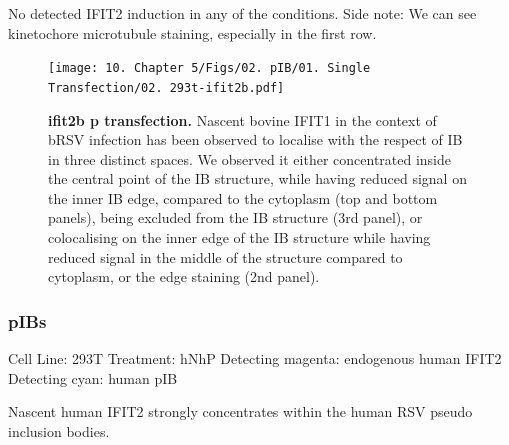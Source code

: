 No detected IFIT2 induction in any of the conditions.
Side note: We can see kinetochore microtubule staining, especially in the first row.

\begin{figure}
    \centering
    \texttt{[image: 10. Chapter 5/Figs/02. pIB/01. Single Transfection/02. 293t-ifit2b.pdf]}
    \caption[ifit2b p transfection]{\textbf{ifit2b p transfection.} Nascent bovine IFIT1 in the context of bRSV infection has been observed to localise with the respect of IB in three distinct spaces. We observed it either concentrated inside the central point of the IB structure, while having reduced signal on the inner IB edge, compared to the cytoplasm (top and bottom panels), being excluded from the IB structure (3rd panel), or colocalising on the inner edge of the IB structure while having reduced signal in the middle of the structure compared to cytoplasm, or the edge staining (2nd panel).}
    \label{fig:ifit2b p transfection}
\end{figure}

\subsubsection{pIBs}
Cell Line: 293T \newline
Treatment: hNhP \newline
Detecting magenta: endogenous human IFIT2 \newline
Detecting cyan: human pIB \newline

Nascent human IFIT2 strongly concentrates within the human RSV pseudo inclusion bodies.

